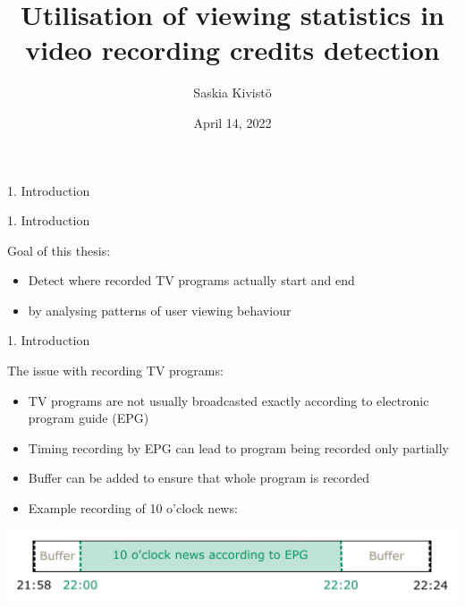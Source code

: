 \documentclass[first=orange,second=blue,logo=blueque]{aaltoslides}
\title{Utilisation of viewing statistics in video recording credits detection}
\author[S. Kivistö]{Saskia Kivistö}
\institute[ICS]{Bachelor's thesis presentation}
\date{April 14, 2022}
\begin{document}


\aaltotitleframe


\begin{frame}{1. Introduction}
\end{frame}


\begin{frame}{1. Introduction}
    \begin{block}{{\color{black}Goal of this thesis:}}
        \begin{itemize}
        \item Detect where recorded TV programs actually start and end
        \item by analysing patterns of user viewing behaviour
        \end{itemize}
    \end{block}
\end{frame}


\begin{frame}{1. Introduction}
    \begin{block}{{\color{black}The issue with recording TV programs:}}
        \begin{itemize}
            \item TV programs are not usually broadcasted exactly according to electronic program guide (EPG)
            \item Timing recording by EPG can lead to program being recorded only partially
            \item Buffer can be added to ensure that whole program is recorded
            \item Example recording of 10 o'clock news:
        \end{itemize}
        \center
        \includegraphics[width=1\textwidth]{figures/recording0.pdf}
    \end{block}
\end{frame}
    
\end{document}
